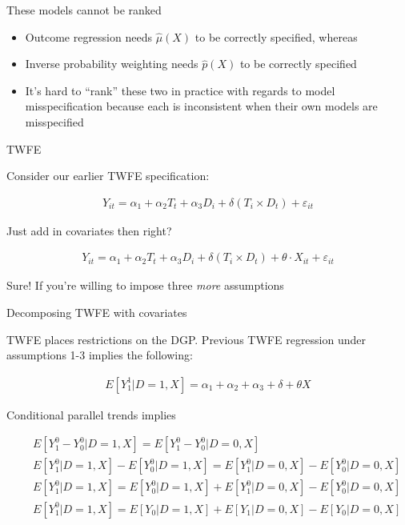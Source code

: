 \documentclass{beamer}
\begin{document}
\begin{frame}{These models cannot be ranked}

\begin{itemize}
\item Outcome regression needs $\widehat{\mu}(X)$ to be correctly specified, whereas
\item Inverse probability weighting needs $\widehat{p}(X)$ to be correctly specified
\item It's hard to ``rank'' these two in practice with regards to model misspecification because each is inconsistent when their own models are misspecified
\end{itemize}

\end{frame}


\begin{frame}{TWFE}

Consider our earlier TWFE specification:

\begin{eqnarray*}
Y_{it} = \alpha_1  + \alpha_2 T_t + \alpha_3 D_i +  \delta (T_i \times D_t)  + \varepsilon_{it}
\end{eqnarray*}

\bigskip

Just add in covariates then right?

\begin{eqnarray*}
Y_{it} = \alpha_1  + \alpha_2 T_t + \alpha_3 D_i  + \delta (T_i \times D_t) + \theta \cdot X_{it} + \varepsilon_{it}
\end{eqnarray*}

Sure! If you're willing to impose three \emph{more} assumptions

\end{frame}




\begin{frame}{Decomposing TWFE with covariates}

TWFE places restrictions on the DGP. Previous TWFE regression under assumptions 1-3 implies the following:

\bigskip

\begin{eqnarray*}
E[Y^1_1|D=1,X] = \alpha_1 + \alpha_2 + \alpha_3 + \delta + \theta X
\end{eqnarray*}

\bigskip

Conditional parallel trends implies

\small
\begin{eqnarray*}
&&E[Y^0_{1} - Y^0_{0}|D=1,X]= E[Y^0_{1} - Y^0_{0}|D=0,X] \\
&&E[Y^0_{1}|D=1,X] - E[Y^0_{0}|D=1,X]= E[Y^0_{1}|D=0,X] - E[Y^0_{0}|D=0,X] \\
&&E[Y^0_{1}|D=1,X] = E[Y^0_{0}|D=1,X] + E[Y^0_{1}|D=0,X] - E[Y^0_{0}|D=0,X] \\
&&E[Y^0_{1}|D=1,X] = E[Y_{0}|D=1,X] + E[Y_{1}|D=0,X] - E[Y_{0}|D=0,X] \\
\end{eqnarray*}


\end{frame}
\end{document}
